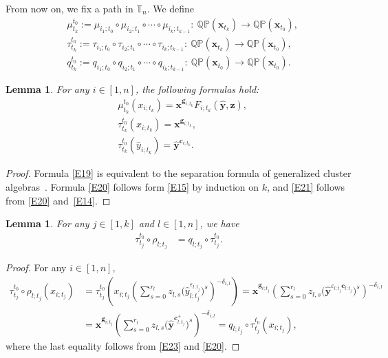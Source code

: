 \documentclass[pdftex]{sigma}
\numberwithin{equation}{section}
\newtheorem{Lemma}[Theorem]{Lemma}
\begin{document}
From now on, we fix a path
 in $\mathbb{T}_n$. We define
\begin{align*}
 &\mu_{t_k}^{t_0}:=\mu_{i_1;t_0}\circ \mu_{i_2;t_1}\circ\cdots\circ \mu_{i_k;t_{k-1}}\colon\ \mathbb{QP}(\mathbf{x}_{t_k})\to \mathbb{QP}(\mathbf{x}_{t_0}),\\
 &\tau_{t_k}^{t_0}:=\tau_{i_1;t_0}\circ\tau_{i_2;t_1}\circ\cdots\circ \tau_{i_k;t_{k-1}}\colon\  \mathbb{QP}(\mathbf{x}_{t_k})\to \mathbb{QP}(\mathbf{x}_{t_0}),\\
 &q_{t_k}^{t_0}:=q_{i_1;t_0}\circ q_{i_2;t_1}\circ\cdots\circ q_{i_k;t_{k-1}}\colon\   \mathbb{QP}(\mathbf{x}_{t_0})\to \mathbb{QP}(\mathbf{x}_{t_0}).
\end{align*}

\begin{Lemma}\label{L9}
For any $i\in [1,n]$, the following formulas hold:
\begin{align}
& \mu_{t_k}^{t_0}(x_{i;t_k})=\mathbf{x}^{\mathbf{g}_{i;t_k}}F_{i;t_k}(\mathbf{\hat{y}},\mathbf{z}),\label{E19}\\
 &\tau_{t_k}^{t_0}(x_{i;t_k})=\mathbf{x}^{\mathbf{g}_{i;t_k}},\label{E20}\\
 &\tau_{t_k}^{t_0}(\hat{y}_{i;t_k})=\mathbf{\hat{y}}^{\mathbf{c}_{i;t_k}}\label{E21}.
\end{align}
\end{Lemma}
\begin{proof}
Formula \eqref{E19} is equivalent to the separation formula of generalized cluster alge\-bras~\cite{Nakanishi14}. Formula \eqref{E20} follows form \eqref{E15} by induction on $k$, and \eqref{E21} follows from \eqref{E20} and~\eqref{E14}.
\end{proof}

\begin{Lemma}
 For any $j\in [1,k]$ and $l\in [1,n]$, we have
 \begin{align}
 \tau_{t_j}^{t_0}\circ\rho_{l;t_j}&=q_{l;t_j}\circ\tau_{t_j}^{t_0}.\label{E24}
\end{align}
\end{Lemma}
\begin{proof}
For any $i\in [1,n]$,
\begin{align*}
 \tau_{t_j}^{t_0}\circ\rho_{l;t_j}(x_{i;t_j})
 &=\tau_{t_j}^{t_0}\left(x_{i;t_j}\left(\sum\limits_{s=0}^{r_{l}}z_{l,s}\bigl(\hat{y}^{\varepsilon_{l;t_j}}_{l;t_j}\bigr)^s\right)^{-\delta_{i,l}}\right)
 =\mathbf{x}^{\mathbf{g}_{i;t_j}}\left(\sum\limits_{s=0}^{r_{l}}z_{l,s}\bigl(\mathbf{\hat{y}}^{\varepsilon_{l;t_j}\mathbf{c}_{l;t_j}}\bigr)^s\right)^{-\delta_{i,l}}\\
 &=\mathbf{x}^{\mathbf{g}_{i;t_j}}\left(\sum\limits_{s=0}^{r_{l}}z_{l,s}\bigl(\mathbf{\hat{y}}^{\mathbf{c}_{l;t_j}^+}\bigr)^s\right)^{-\delta_{i,l}}
 =q_{l;t_j}\circ\tau_{t_j}^{t_0}(x_{i;t_j}),
 \end{align*}
 where the last equality follows from \eqref{E23} and \eqref{E20}.
\end{proof}
\end{document}
